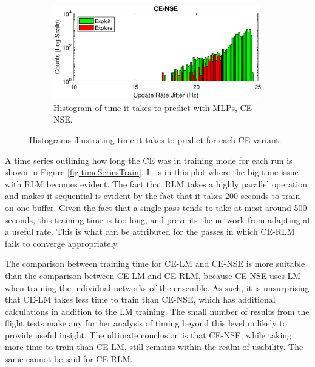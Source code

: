 \begin{figure}[ht]
\begin{subfigure}{\linewidth}
\centering
\includegraphics[scale=0.7]{figures/flight_results/coop_great_nse_updateRateJitter_log.eps}
\caption{Histogram of time it takes to predict with MLPs, CE-NSE.}
\label{fig:flightCoopGreatNSEExecTime}
\end{subfigure}
\caption{Histograms illustrating time it takes to predict for each CE variant.}
\label{fig:histExecTimes}
\end{figure}

\clearpage
\par A time series outlining how long the CE was in training mode for each run is shown in Figure \ref{fig:timeSeriesTrain}. It is in this plot where the big time issue with RLM becomes evident. The fact that RLM takes a highly parallel operation and makes it sequential is evident by the fact that it takes 200 seconds to train on one buffer. Given the fact that a single pass tends to take at most around 500 seconds, this training time is too long, and prevents the network from adapting at a useful rate. This is what can be attributed for the passes in which CE-RLM fails to converge appropriately.
\par The comparison between training time for CE-LM and CE-NSE is more suitable than the comparison between CE-LM and CE-RLM, because CE-NSE uses LM when training the individual networks of the ensemble. As such, it is unsurprising that CE-LM takes less time to train than CE-NSE, which has additional calculations in addition to the LM training. The small number of results from the flight tests make any further analysis of timing beyond this level unlikely to provide useful insight. The ultimate conclusion is that CE-NSE, while taking more time to train than CE-LM, still remains within the realm of usability. The same cannot be said for CE-RLM. 

